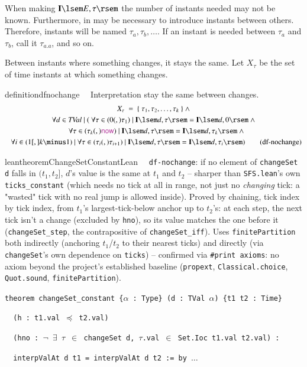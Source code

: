 When making $\mathbf{I}\lsem E,\tau\rsem$ the number of instants needed may not be known.  Furthermore, in may be necessary to introduce instants between others.
Therefore, instants will be named $\tau_a,\tau_b,\ldots$.  If an instant is needed between $\tau_a$ and $\tau_b$, call it $\tau_{a.a}$, and so on.

Between instants where something changes, it stays the same.  Let $X_\tau$ be the set of time instants at which something changes.
\begin{restatable}{definition}{dfnochange}~~ Interpretation stay the same between changes.
\begin{gather}
X_\tau~=~\{~\tau_1,\tau_2,\ldots,\tau_k~\}~\wedge \notag \\
\forall d\in \mathit{TVal}~\vert~(~\forall \tau\in (0(,) \tau_1)~\vert~\mathbf{I}\lsem d,\tau\rsem=\mathbf{I}\lsem d,0 \rsem ~\wedge \notag \\
~~~\forall \tau\in (\tau_k(,) \mathsf{\mc{now}})~\vert~\mathbf{I}\lsem d,\tau\rsem=\mathbf{I}\lsem d,\tau_k \rsem ~\wedge \notag \\
~~~\forall i\in(1[,]k\minus 1)~\vert~\forall \tau\in (\tau_i(,) \tau_{i+1})~\vert~\mathbf{I}\lsem d,\tau\rsem=\mathbf{I}\lsem d,\tau_i \rsem )\label{eq:df-nochange}\tag{df-nochange}
\end{gather}
\end{restatable}

\begin{restatable}{leantheorem}{ChangeSetConstantLean}~~ \texttt{df-nochange}:
if no element of \texttt{changeSet d} falls in $(t_1,t_2]$, $d$'s value is the same at $t_1$ and $t_2$ --
sharper than \texttt{SFS.lean}'s own \texttt{ticks\_constant} (which needs no tick at all in range, not
just no \emph{changing} tick: a "wasted" tick with no real jump is allowed inside). Proved by chaining,
tick index by tick index, from $t_1$'s largest-tick-below anchor up to $t_2$'s: at each step, the next
tick isn't a change (excluded by \texttt{hno}), so its value matches the one before it
(\texttt{changeSet\_step}, the contrapositive of \texttt{changeSet\_iff}). Uses
\texttt{finitePartition} both indirectly (anchoring $t_1$/$t_2$ to their nearest ticks) and directly (via
\texttt{changeSet}'s own dependence on \texttt{ticks}) -- confirmed via \texttt{\#print axioms}: no axiom
beyond the project's established baseline (\texttt{propext}, \texttt{Classical.choice},
\texttt{Quot.sound}, \texttt{finitePartition}).

\texttt{\textcolor{leancolor}{theorem} \textcolor{leanyellow}{changeSet\_constant} \{$\alpha$ : Type\} (d : TVal $\alpha$) \{t1 t2 : Time\}}

\texttt{~~(h : t1.val $\preceq$ t2.val)}

\texttt{~~(hno : $\lnot$ $\exists$ $\tau$ $\in$ changeSet d, $\tau$.val $\in$ Set.Ioc t1.val t2.val) :}

\texttt{~~interpValAt d t1 = interpValAt d t2 := by $\ldots$}
\label{changeSet_constant}
\end{restatable}

